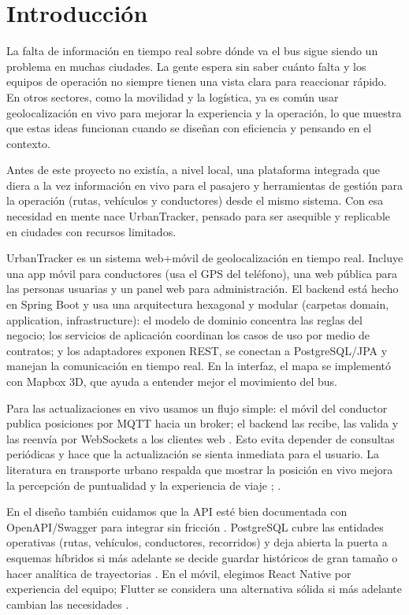 \section{Introducción}
La falta de información en tiempo real sobre dónde va el bus sigue siendo un problema en muchas ciudades. La gente espera sin saber cuánto falta y los equipos de operación no siempre tienen una vista clara para reaccionar rápido. En otros sectores, como la movilidad y la logística, ya es común usar geolocalización en vivo para mejorar la experiencia y la operación, lo que muestra que estas ideas funcionan cuando se diseñan con eficiencia y pensando en el contexto.

Antes de este proyecto no existía, a nivel local, una plataforma integrada que diera a la vez información en vivo para el pasajero y herramientas de gestión para la operación (rutas, vehículos y conductores) desde el mismo sistema. Con esa necesidad en mente nace UrbanTracker, pensado para ser asequible y replicable en ciudades con recursos limitados.

UrbanTracker es un sistema web+móvil de geolocalización en tiempo real. Incluye una app móvil para conductores (usa el GPS del teléfono), una web pública para las personas usuarias y un panel web para administración. El backend está hecho en Spring Boot y usa una arquitectura hexagonal y modular (carpetas domain, application, infrastructure): el modelo de dominio concentra las reglas del negocio; los servicios de aplicación coordinan los casos de uso por medio de contratos; y los adaptadores exponen REST, se conectan a PostgreSQL/JPA y manejan la comunicación en tiempo real. En la interfaz, el mapa se implementó con Mapbox 3D, que ayuda a entender mejor el movimiento del bus.

Para las actualizaciones en vivo usamos un flujo simple: el móvil del conductor publica posiciones por MQTT hacia un broker; el backend las recibe, las valida y las reenvía por WebSockets a los clientes web \cite{sismo2016}. Esto evita depender de consultas periódicas y hace que la actualización se sienta inmediata para el usuario. La literatura en transporte urbano respalda que mostrar la posición en vivo mejora la percepción de puntualidad y la experiencia de viaje \cite{cityruta2018}; \cite{stopbus2016}.

En el diseño también cuidamos que la API esté bien documentada con OpenAPI/Swagger para integrar sin fricción \cite{easyrest2022}. PostgreSQL cubre las entidades operativas (rutas, vehículos, conductores, recorridos) y deja abierta la puerta a esquemas híbridos si más adelante se decide guardar históricos de gran tamaño o hacer analítica de trayectorias \cite{ingenieria2022}. En el móvil, elegimos React Native por experiencia del equipo; Flutter se considera una alternativa sólida si más adelante cambian las necesidades \cite{flutter2022new}.

